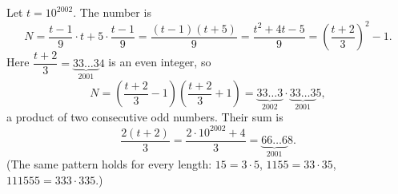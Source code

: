 Let $t=10^{2002}$. The number is
\[
N=\dfrac{t-1}{9}\cdot t+5\cdot\dfrac{t-1}{9}=\dfrac{(t-1)(t+5)}{9}=\dfrac{t^2+4t-5}{9}=\left(\dfrac{t+2}{3}\right)^2-1 .
\]
Here $\dfrac{t+2}{3}=\underbrace{33\ldots3}_{2001}4$ is an even integer, so
\[
N=\left(\dfrac{t+2}{3}-1\right)\left(\dfrac{t+2}{3}+1\right)=\underbrace{33\ldots3}_{2002}\cdot\underbrace{33\ldots3}_{2001}5 ,
\]
a product of two consecutive odd numbers. Their sum is
\[
\dfrac{2(t+2)}{3}=\dfrac{2\cdot10^{2002}+4}{3}=\boxed{\underbrace{66\ldots6}_{2001}8} .
\]
(The same pattern holds for every length: $15=3\cdot5$, $1155=33\cdot35$, $111555=333\cdot335$.)
